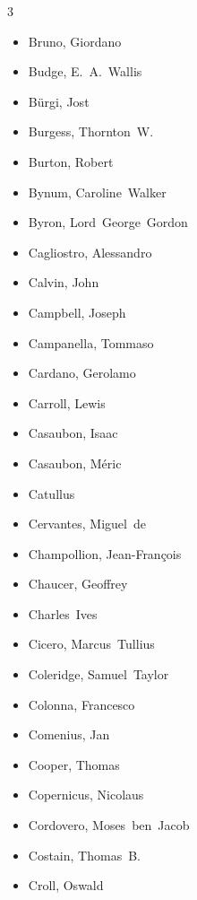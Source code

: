 \documentclass[10pt,makeidx]{extreport}
\begin{document}
\begin{multicols}{3}
\begin{itemize}
		\item Bruno, Giordano
		\item Budge, E.~A.~Wallis
		\item Bürgi, Jost
		\item Burgess, Thornton~W.
		\item Burton, Robert
		\item Bynum, Caroline~Walker
		\item Byron, Lord~George~Gordon
		\item Cagliostro, Alessandro
		\item Calvin, John
		\item Campbell, Joseph
		\item Campanella, Tommaso
		\item Cardano, Gerolamo
		\item Carroll, Lewis
		\item Casaubon, Isaac
		\item Casaubon, Méric
		\item Catullus
		\item Cervantes, Miguel~de
		\item Champollion, Jean-François
		\item Chaucer, Geoffrey
		\item Charles~Ives
		\item Cicero, Marcus~Tullius
		\item Coleridge, Samuel~Taylor
		\item Colonna, Francesco
		\item Comenius, Jan
		\item Cooper, Thomas
		\item Copernicus, Nicolaus
		\item Cordovero, Moses~ben~Jacob
		\item Costain, Thomas~B.
		\item Croll, Oswald

\end{itemize}
\end{multicols}
\end{document}
